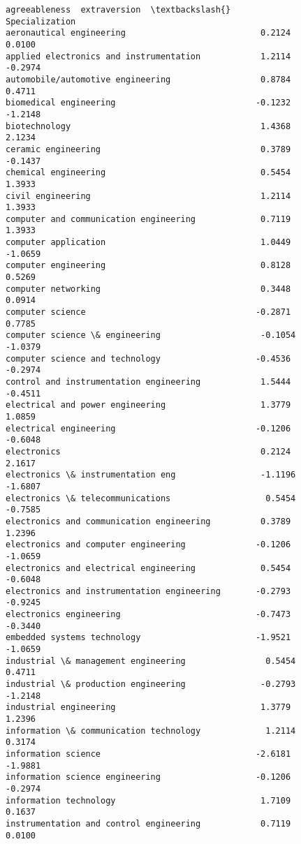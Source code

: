 \documentclass[11pt]{article}
\begin{document}
\begin{tcolorbox}[breakable, size=fbox, boxrule=.5pt, pad at break*=1mm, opacityfill=0]
\begin{Verbatim}[commandchars=\\\{\}]
                                            agreeableness  extraversion  \textbackslash{}
Specialization
aeronautical engineering                           0.2124        0.0100
applied electronics and instrumentation            1.2114       -0.2974
automobile/automotive engineering                  0.8784        0.4711
biomedical engineering                            -0.1232       -1.2148
biotechnology                                      1.4368        2.1234
ceramic engineering                                0.3789       -0.1437
chemical engineering                               0.5454        1.3933
civil engineering                                  1.2114        1.3933
computer and communication engineering             0.7119        1.3933
computer application                               1.0449       -1.0659
computer engineering                               0.8128        0.5269
computer networking                                0.3448        0.0914
computer science                                  -0.2871        0.7785
computer science \& engineering                    -0.1054       -1.0379
computer science and technology                   -0.4536       -0.2974
control and instrumentation engineering            1.5444       -0.4511
electrical and power engineering                   1.3779        1.0859
electrical engineering                            -0.1206       -0.6048
electronics                                        0.2124        2.1617
electronics \& instrumentation eng                 -1.1196       -1.6807
electronics \& telecommunications                   0.5454       -0.7585
electronics and communication engineering          0.3789        1.2396
electronics and computer engineering              -0.1206       -1.0659
electronics and electrical engineering             0.5454       -0.6048
electronics and instrumentation engineering       -0.2793       -0.9245
electronics engineering                           -0.7473       -0.3440
embedded systems technology                       -1.9521       -1.0659
industrial \& management engineering                0.5454        0.4711
industrial \& production engineering               -0.2793       -1.2148
industrial engineering                             1.3779        1.2396
information \& communication technology             1.2114        0.3174
information science                               -2.6181       -1.9881
information science engineering                   -0.1206       -0.2974
information technology                             1.7109        0.1637
instrumentation and control engineering            0.7119        0.0100

\end{Verbatim}
\end{tcolorbox}
\end{document}
